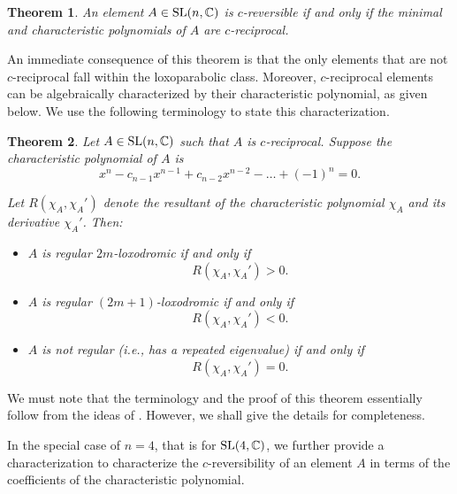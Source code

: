 \documentclass[11pt]{amsart}
\numberwithin{equation}{section}
\theoremstyle{plain}
\newtheorem{theorem}{Theorem}[section]
\theoremstyle{definition}
\newcommand{\C}{\mathbb{C}}
\numberwithin{equation}{section}
\def \SL{ {\rm SL}}
\begin{document}
\begin{theorem}\label{CM} 
An element $A \in \SL(n, \C)$ is $c$-reversible if and only if the minimal and characteristic polynomials of $A$ are  $c$-reciprocal. 
\end{theorem}
An immediate consequence of this theorem is that the only elements that are not $c$-reciprocal fall within the loxoparabolic class. Moreover, 
$c$-reciprocal elements can be algebraically characterized by their characteristic polynomial, as given below. We use the following terminology to state this characterization.  
\begin{theorem}\label{RT}
Let $A \in \SL(n, \C)$ such that $A$ is $c$-reciprocal. Suppose the characteristic polynomial of \( A \) is 
\[
x^n - c_{n-1}x^{n-1} + c_{n-2}x^{n-2} - \dots + (-1)^n = 0.
\]

 Let \( R(\chi_A, \chi_A') \) denote the resultant of the characteristic polynomial \( \chi_A \) and its derivative \( \chi_A' \).  Then:
\begin{itemize}
    \item[(i)] \( A \) is \emph{regular \( 2m \)-loxodromic} if and only if
    \[
    R(\chi_A, \chi_A') > 0.
    \]

    \item[(ii)] \( A \) is \emph{regular \( (2m + 1) \)-loxodromic} if and only if
    \[
    R(\chi_A, \chi_A') < 0.
    \]

    \item[(iii)] \( A \) is \emph{not regular} (i.e., has a repeated eigenvalue) if and only if
    \[
    R(\chi_A, \chi_A') = 0.
    \]
\end{itemize}
 \end{theorem}
We must note that the terminology and the proof of this theorem essentially follow from the ideas of \cite[Theorem 3.1]{gpp}. However, we shall give the details for completeness.

 \medskip 
 
In the special case of $n=4$, that is for $\SL(4, \C)$,  we further provide a characterization to characterize the $c$-reversibility of an element $A$ in terms of the coefficients of the characteristic polynomial. 
\end{document}
